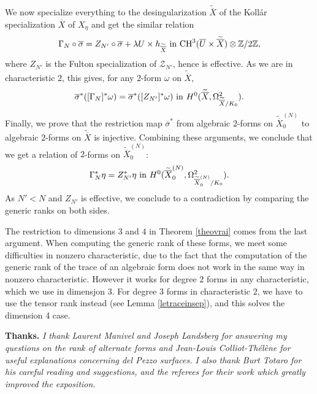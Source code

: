 \documentclass[10pt]{article}
\begin{document}
We now specialize everything  to the desingularization $\widetilde{\overline{X}}$ of the   Koll\'ar specialization $\overline{X}$ of $X_\eta$ and get the similar  relation
\begin{eqnarray}\label{eqnewdu24}\Gamma_N\circ \overline{\sigma}={Z}_{N'}\circ \overline{\sigma}+\lambda U\times h_{\widetilde{\overline{X}}}\,\,{\rm in}\,\, {\rm CH}^3(\overline{U}\times \widetilde{\overline{X}})\otimes\mathbb{Z}/2\mathbb{Z},\end{eqnarray}
where ${Z}_{N'}$ is the Fulton specialization of $\mathcal{Z}_{N'}$, hence is effective.
As we are in characteristic $2$, this  gives, for  any $2$-form $\omega$ on $\widetilde{\overline{X}}$,
$$ \overline{\sigma}^*([\Gamma_N]^*\omega)=\overline{\sigma}^*([{Z}_{N'}]^*\omega)\,\,{\rm in}\,\,H^0(\widetilde{\overline{X}},\Omega_{\widetilde{\overline{X}}/K_0}^2).$$
Finally, we  prove that the restriction map $\overline{\sigma}^*$ from  algebraic $2$-forms on $\widetilde{\overline{X}}^{(N)}_0$ to algebraic $2$-forms on $\widetilde{\overline{X}}$  is injective. Combining these arguments, we conclude that we get a relation
of $2$-forms on $\widetilde{\overline{X}}^{(N)}_0$:
$$ \Gamma_N^*\eta=Z_{N'}^*\eta\,\,{\rm in}\,\, H^0(\widetilde{\overline{X}}^{(N)}_0,\Omega_{\widetilde{\overline{X}}^{(N)}_0/K_0}^2).$$
As $N'<N$ and $Z_{N'}$ is effective, we conclude to a contradiction by comparing the generic  ranks on both sides.

The restriction to dimensions $3$ and $4$ in Theorem \ref{theovrai} comes from the last argument. When computing the generic rank of these forms, we meet some difficulties in nonzero characteristic, due to the fact that the computation of the  generic rank of the trace of an algebraic form does not work in the same way in nonzero characteristic. However it works for degree $2$ forms in any characteristic, which we use in dimensjon $3$. For   degree $3$ forms in characteristic $2$, we have to  use the tensor rank instead  (see Lemma  \ref{letraceinsep}), and this solves the dimension 4 case.








\vspace{0.5cm}


{\bf Thanks.} {\it   I thank Laurent Manivel and Joseph Landsberg for answering my questions on the rank of alternate forms and  Jean-Louis Colliot-Th\'{e}l\`{e}ne for  useful  explanations concerning del Pezzo surfaces. I also thank Burt Totaro for his    careful reading and suggestions, and the referees for their work which greatly  improved the exposition.}
\end{document}
